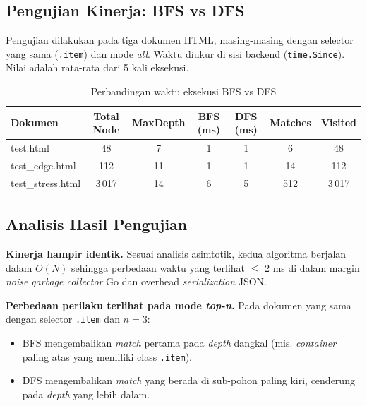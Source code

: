 \subsection{Pengujian Kinerja: BFS vs DFS}

Pengujian dilakukan pada tiga dokumen HTML, masing-masing dengan selector yang sama (\texttt{.item}) dan mode \textit{all}. Waktu diukur di sisi backend (\texttt{time.Since}). Nilai adalah rata-rata dari 5 kali eksekusi.

\begin{table}[H]
\centering
\caption{Perbandingan waktu eksekusi BFS vs DFS}
\begin{tabular}{|l|c|c|c|c|c|c|}
\hline
\textbf{Dokumen} & \textbf{Total Node} & \textbf{MaxDepth} & \textbf{BFS (ms)} & \textbf{DFS (ms)} & \textbf{Matches} & \textbf{Visited} \\
\hline
test.html & 48 & 7 & 1 & 1 & 6 & 48 \\
\hline
test\_edge.html & 112 & 11 & 1 & 1 & 14 & 112 \\
\hline
test\_stress.html & 3\,017 & 14 & 6 & 5 & 512 & 3\,017 \\
\hline
\end{tabular}
\end{table}

\subsection{Analisis Hasil Pengujian}

\textbf{Kinerja hampir identik.} Sesuai analisis asimtotik, kedua algoritma berjalan dalam $O(N)$ sehingga perbedaan waktu yang terlihat $\le$ 2 ms di dalam margin \textit{noise} \textit{garbage collector} Go dan overhead \textit{serialization} JSON.

\textbf{Perbedaan perilaku terlihat pada mode \textit{top-n}.} Pada dokumen yang sama dengan selector \texttt{.item} dan $n = 3$:
\begin{itemize}
    \item BFS mengembalikan \textit{match} pertama pada \textit{depth} dangkal (mis. \textit{container} paling atas yang memiliki class \texttt{.item}).
    \item DFS mengembalikan \textit{match} yang berada di sub-pohon paling kiri, cenderung pada \textit{depth} yang lebih dalam.
\end{itemize}